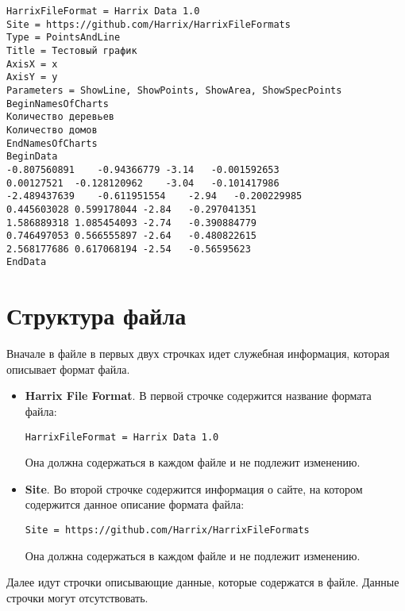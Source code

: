 \documentclass[a4paper,12pt]{article}
\begin{document}
\begin{lstlisting}[label=Example01,caption=Пример файла *.hdata]
HarrixFileFormat = Harrix Data 1.0
Site = https://github.com/Harrix/HarrixFileFormats
Type = PointsAndLine
Title = Тестовый график
AxisX = x
AxisY = y
Parameters = ShowLine, ShowPoints, ShowArea, ShowSpecPoints
BeginNamesOfCharts
Количество деревьев
Количество домов
EndNamesOfCharts
BeginData
-0.807560891	-0.94366779	-3.14	-0.001592653
0.00127521	-0.128120962	-3.04	-0.101417986
-2.489437639	-0.611951554	-2.94	-0.200229985
0.445603028	0.599178044	-2.84	-0.297041351
1.586889318	1.085454093	-2.74	-0.390884779
0.746497053	0.566555897	-2.64	-0.480822615
2.568177686	0.617068194	-2.54	-0.56595623
EndData
\end{lstlisting}

\section{Структура файла}

Вначале в файле в первых двух строчках идет служебная информация, которая описывает формат файла.

\begin{itemize}
\item \textbf{Harrix File Format}.
В первой строчке содержится название формата файла:
\begin{lstlisting}[label=Line01,caption=Первая строчка файла *.hdata]
HarrixFileFormat = Harrix Data 1.0
\end{lstlisting}
Она должна содержаться в каждом файле и не подлежит изменению.

\item \textbf{Site}.
Во второй строчке содержится информация о сайте, на котором содержится данное описание формата файла:
\begin{lstlisting}[label=Line02,caption=Вторая строчка файла *.hdata]
Site = https://github.com/Harrix/HarrixFileFormats
\end{lstlisting}
Она должна содержаться в каждом файле и не подлежит изменению.
\end{itemize}

Далее идут строчки описывающие данные, которые содержатся в файле. Данные строчки могут отсутствовать.
\end{document}
